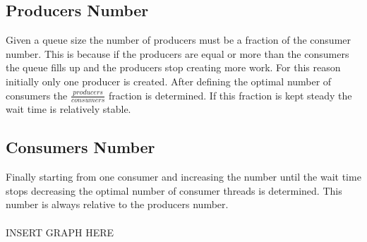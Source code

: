 \documentclass[a4paper, 12pt]{report}
\begin{document}
    \subsection*{Producers Number}
    
    Given a queue size the number of producers must be a fraction of the consumer number. This is because if the 
    producers are equal or more than the consumers the queue fills up and the producers stop creating more work.
    For this reason initially only one producer is created. After defining the optimal number of consumers the 
    $ \frac{producers}{consumers}$ fraction is determined. If this fraction is kept steady the wait time is 
    relatively stable.

    \subsection*{Consumers Number}

    Finally starting from one consumer and increasing the number until the wait time stops decreasing the optimal 
    number of consumer threads is determined. This number is always relative to the producers number.
    \\
    \\
    \noindent INSERT GRAPH HERE
\end{document}
